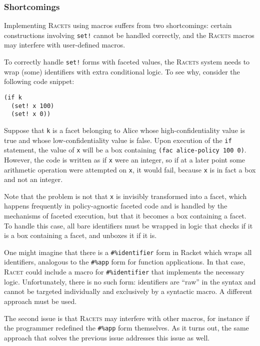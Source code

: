 \documentclass{article}
\begin{document}
\subsubsection{Shortcomings\label{sec:shortcomings}}
Implementing \textsc{Racets} using macros suffers from two shortcomings: certain constructions involving \texttt{set!} cannot be handled correctly, and the \textsc{Racets} macros may interfere with user-defined macros.

To correctly handle \texttt{set!} forms with faceted values, the \textsc{Racets} system needs to wrap (some) identifiers with extra conditional logic. To see why, consider the following code snippet:

\begin{lstlisting}
(if k
  (set! x 100)
  (set! x 0))
\end{lstlisting}

Suppose that \texttt{k} is a facet belonging to Alice whose high-confidentiality value is true and whose low-confidentiality value is false. Upon execution of the \texttt{if} statement, the value of \texttt{x} will be a box containing \texttt{(fac alice-policy 100 0)}. However, the code is written as if \texttt{x} were an integer, so if at a later point some arithmetic operation were attempted on \texttt{x}, it would fail, because \texttt{x} is in fact a box and not an integer.

Note that the problem is not that \texttt{x} is invisibly transformed into a facet, which happens frequently in policy-agnostic faceted code and is handled by the mechanisms of faceted execution, but that it becomes a box containing a facet. To handle this case, all bare identifiers must be wrapped in logic that checks if it is a box containing a facet, and unboxes it if it is.

One might imagine that there is a \texttt{\#\%identifier} form in Racket which wraps all identifiers, analogous to the \texttt{\#\%app} form for function applications. In that case, \textsc{Racet} could include a macro for \texttt{\#\%identifier} that implements the necessary logic. Unfortunately, there is no such form: identifiers are ``raw'' in the syntax and cannot be targeted individually and exclusively by a syntactic macro. A different approach must be used.

The second issue is that \textsc{Racets} may interfere with other macros, for instance if the programmer redefined the \texttt{\#\%app} form themselves. As it turns out, the same approach that solves the previous issue addresses this issue as well.
\end{document}
